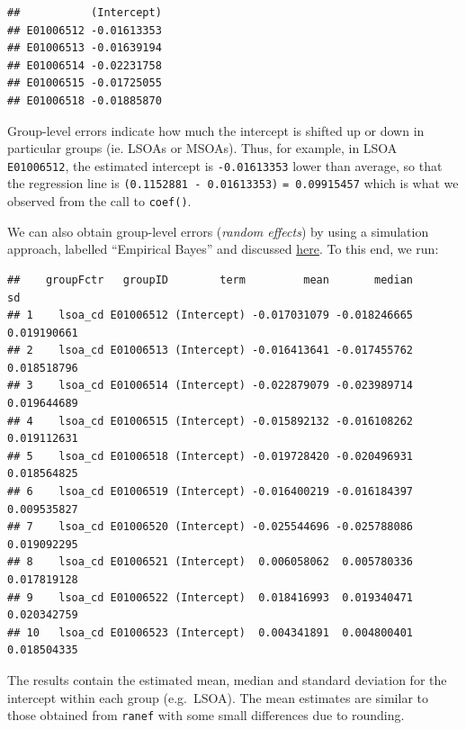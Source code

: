 \documentclass[
]{book}
\newenvironment{Shaded}{\begin{snugshade}}{\end{snugshade}}
\newcommand{\CommentTok}[1]{\textcolor[rgb]{0.56,0.35,0.01}{\textit{#1}}}
\newcommand{\DecValTok}[1]{\textcolor[rgb]{0.00,0.00,0.81}{#1}}
\newcommand{\KeywordTok}[1]{\textcolor[rgb]{0.13,0.29,0.53}{\textbf{#1}}}
\newcommand{\NormalTok}[1]{#1}
\newcommand{\OperatorTok}[1]{\textcolor[rgb]{0.81,0.36,0.00}{\textbf{#1}}}
\newcommand{\StringTok}[1]{\textcolor[rgb]{0.31,0.60,0.02}{#1}}
\begin{document}
\begin{verbatim}
##           (Intercept)
## E01006512 -0.01613353
## E01006513 -0.01639194
## E01006514 -0.02231758
## E01006515 -0.01725055
## E01006518 -0.01885870
\end{verbatim}

Group-level errors indicate how much the intercept is shifted up or down in particular groups (ie. LSOAs or MSOAs). Thus, for example, in LSOA \texttt{E01006512}, the estimated intercept is \texttt{-0.01613353} lower than average, so that the regression line is \texttt{(0.1152881\ -\ 0.01613353)} \texttt{=\ 0.09915457} which is what we observed from the call to \texttt{coef()}.

We can also obtain group-level errors (\emph{random effects}) by using a simulation approach, labelled ``Empirical Bayes'' and discussed \href{https://stat.ethz.ch/pipermail/r-sig-mixed-models/2009q4/002984.html}{here}. To this end, we run:

\begin{Shaded}
\end{Shaded}

\begin{verbatim}
##    groupFctr   groupID        term         mean       median          sd
## 1    lsoa_cd E01006512 (Intercept) -0.017031079 -0.018246665 0.019190661
## 2    lsoa_cd E01006513 (Intercept) -0.016413641 -0.017455762 0.018518796
## 3    lsoa_cd E01006514 (Intercept) -0.022879079 -0.023989714 0.019644689
## 4    lsoa_cd E01006515 (Intercept) -0.015892132 -0.016108262 0.019112631
## 5    lsoa_cd E01006518 (Intercept) -0.019728420 -0.020496931 0.018564825
## 6    lsoa_cd E01006519 (Intercept) -0.016400219 -0.016184397 0.009535827
## 7    lsoa_cd E01006520 (Intercept) -0.025544696 -0.025788086 0.019092295
## 8    lsoa_cd E01006521 (Intercept)  0.006058062  0.005780336 0.017819128
## 9    lsoa_cd E01006522 (Intercept)  0.018416993  0.019340471 0.020342759
## 10   lsoa_cd E01006523 (Intercept)  0.004341891  0.004800401 0.018504335
\end{verbatim}

The results contain the estimated mean, median and standard deviation for the intercept within each group (e.g.~LSOA). The mean estimates are similar to those obtained from \texttt{ranef} with some small differences due to rounding.
\end{document}
